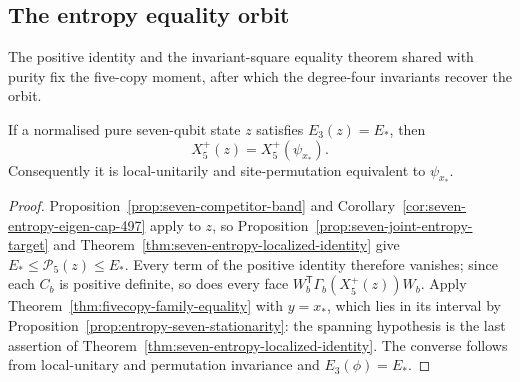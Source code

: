 \subsection{The entropy equality orbit}\label{sec:seven-entropy-equality}

The positive identity and the invariant-square equality theorem shared with
purity fix the five-copy moment, after which the degree-four invariants
recover the orbit.

\begin{proposition}
\label{prop:seven-entropy-equality-moment}
If a normalised pure seven-qubit state $z$ satisfies $E_3(z)=E_*$, then
\[
                     X_5^+(z)=X_5^+(\psi_{x_*}).
\]
Consequently it is local-unitarily and site-permutation equivalent to
$\psi_{x_*}$.
\end{proposition}
\begin{proof}
Proposition~\ref{prop:seven-competitor-band} and Corollary~\ref{cor:seven-entropy-eigen-cap-497} apply to $z$, so
Proposition~\ref{prop:seven-joint-entropy-target} and
Theorem~\ref{thm:seven-entropy-localized-identity} give
$E_*\le\mathcal P_5(z)\le E_*$. Every term of the positive identity
therefore vanishes; since each $C_b$ is positive definite, so does every face
$W_b^{\mathsf T}\Gamma_b(X_5^+(z))W_b$. Apply
Theorem~\ref{thm:fivecopy-family-equality} with $y=x_*$, which lies in its
interval by Proposition~\ref{prop:entropy-seven-stationarity}: the spanning
hypothesis is the last assertion of
Theorem~\ref{thm:seven-entropy-localized-identity}. The converse follows from
local-unitary and permutation invariance and $E_3(\phi)=E_*$.
\end{proof}
